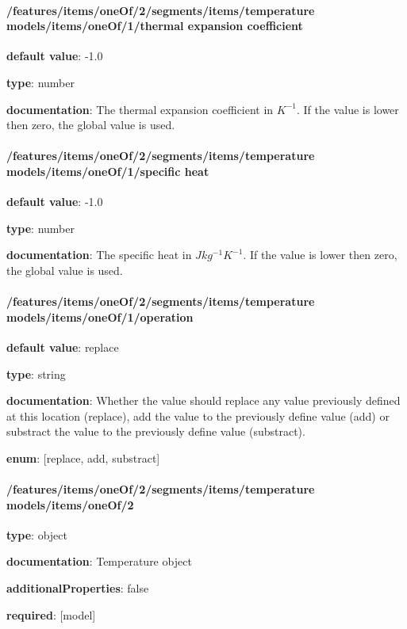 \begin{itemized}
\end{itemized}\paragraph{/features/items/oneOf/2/segments/items/temperature models/items/oneOf/1/thermal expansion coefficient} \begin{itemized}
\item {\bf default value}: -1.0
\item {\bf type}: number
\item {\bf documentation}: The thermal expansion coefficient in $K^{-1}$. If the value is lower then zero, the global value is used.
\end{itemized}\paragraph{/features/items/oneOf/2/segments/items/temperature models/items/oneOf/1/specific heat} \begin{itemized}
\item {\bf default value}: -1.0
\item {\bf type}: number
\item {\bf documentation}: The specific heat in $J kg^{-1} K^{-1}$. If the value is lower then zero, the global value is used.
\end{itemized}\paragraph{/features/items/oneOf/2/segments/items/temperature models/items/oneOf/1/operation} \begin{itemized}
\item {\bf default value}: replace
\item {\bf type}: string
\item {\bf documentation}: Whether the value should replace any value previously defined at this location (replace), add the value to the previously define value (add) or substract the value to the previously define value (substract).
\item {\bf enum}: [replace, add, substract]\end{itemized}\paragraph{/features/items/oneOf/2/segments/items/temperature models/items/oneOf/2} \begin{itemized}
\item {\bf type}: object
\item {\bf documentation}: Temperature object
\item {\bf additionalProperties}: false
\item {\bf required}: [model]\end{itemized}
